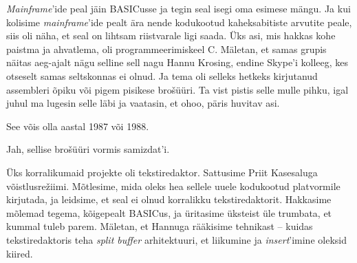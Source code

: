 
\emph{Mainframe}'ide peal jäin BASICusse ja tegin seal isegi 
oma esimese mängu. Ja kui kolisime \emph{mainframe}'ide pealt ära nende 
kodukootud kaheksabitiste arvutite peale, siis oli näha, et seal on lihtsam 
riistvarale ligi saada. Üks asi, mis hakkas kohe paistma ja ahvatlema, 
oli programmeerimiskeel C. Mäletan, et samas grupis näitas aeg-ajalt 
nägu selline sell nagu Hannu Krosing, 
endine Skype'i kolleeg, kes otseselt samas seltskonnas ei olnud. Ja tema oli 
selleks hetkeks kirjutanud assembleri õpiku või pigem pisikese 
brošüüri. Ta vist pistis selle mulle pihku,
igal juhul ma lugesin selle läbi ja vaatasin, et ohoo, päris 
huvitav asi. 


See võis olla aastal 1987 või 1988.


Jah, sellise brošüüri vormis 
samizdat'i. 


Üks korralikumaid projekte oli tekstiredaktor\label{sisu!jaani_tekstiredaktor}. 
Sattusime Priit Kasesaluga 
võistlusrežiimi. Mõtlesime, mida oleks hea sellele uuele kodukootud 
platvormile kirjutada, ja leidsime, et seal ei olnud korralikku tekstiredaktorit. 
Hakkasime mõlemad tegema, kõigepealt BASICus, ja üritasime 
üksteist üle trumbata, et kummal tuleb parem. Mäletan, et 
Hannuga rääkisime tehnikast -- kuidas 
tekstiredaktoris teha \emph{split buffer} arhitektuuri, et 
liikumine ja \emph{insert}'imine oleksid kiired.

